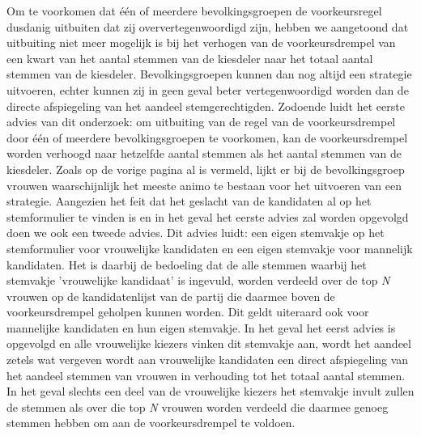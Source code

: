 Om te voorkomen dat één of meerdere bevolkingsgroepen de voorkeursregel dusdanig uitbuiten dat zij oververtegenwoordigd zijn, hebben we aangetoond dat uitbuiting niet meer mogelijk is bij het verhogen van de voorkeursdrempel van een kwart van het aantal stemmen van de kiesdeler naar het totaal aantal stemmen van de kiesdeler. Bevolkingsgroepen kunnen dan nog altijd een strategie uitvoeren, echter kunnen zij in geen geval beter vertegenwoordigd worden dan de directe afspiegeling van het aandeel stemgerechtigden. Zodoende luidt het eerste advies van dit onderzoek: om uitbuiting van de regel van de voorkeursdrempel door één of meerdere bevolkingsgroepen te voorkomen, kan de voorkeursdrempel worden verhoogd naar hetzelfde aantal stemmen als het aantal stemmen van de kiesdeler. 
Zoals op de vorige pagina al is vermeld, lijkt er bij de bevolkingsgroep vrouwen waarschijnlijk het meeste animo te bestaan voor het uitvoeren van een strategie. Aangezien het feit dat het geslacht van de kandidaten al op het stemformulier te vinden is en in het geval het eerste advies zal worden opgevolgd doen we ook een tweede advies. Dit advies luidt: een eigen stemvakje op het stemformulier voor vrouwelijke kandidaten en een eigen stemvakje voor mannelijk kandidaten. Het is daarbij de bedoeling dat de alle stemmen waarbij het stemvakje 'vrouwelijke kandidaat' is ingevuld, worden verdeeld over de top \textit{N} vrouwen op de kandidatenlijst van de partij die daarmee boven de voorkeursdrempel geholpen kunnen worden. Dit geldt uiteraard ook voor mannelijke kandidaten en hun eigen stemvakje. In het geval het eerst advies is opgevolgd en alle vrouwelijke kiezers vinken dit stemvakje aan, wordt het aandeel zetels wat vergeven wordt aan vrouwelijke kandidaten een direct afspiegeling van het aandeel stemmen van vrouwen in verhouding tot het totaal aantal stemmen. In het geval slechts een deel van de vrouwelijke kiezers het stemvakje invult zullen de stemmen als over die top \textit{N} vrouwen worden verdeeld die daarmee genoeg stemmen hebben om aan de voorkeursdrempel te voldoen.

